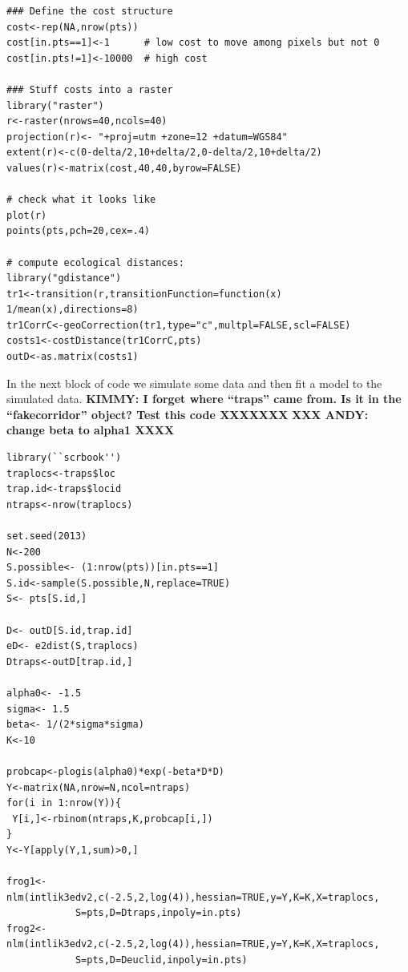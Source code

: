 {\small
\begin{verbatim}
### Define the cost structure
cost<-rep(NA,nrow(pts))
cost[in.pts==1]<-1      # low cost to move among pixels but not 0
cost[in.pts!=1]<-10000  # high cost

### Stuff costs into a raster
library("raster")
r<-raster(nrows=40,ncols=40)
projection(r)<- "+proj=utm +zone=12 +datum=WGS84"
extent(r)<-c(0-delta/2,10+delta/2,0-delta/2,10+delta/2)
values(r)<-matrix(cost,40,40,byrow=FALSE)

# check what it looks like
plot(r)  
points(pts,pch=20,cex=.4)

# compute ecological distances:
library("gdistance")
tr1<-transition(r,transitionFunction=function(x) 1/mean(x),directions=8)
tr1CorrC<-geoCorrection(tr1,type="c",multpl=FALSE,scl=FALSE)
costs1<-costDistance(tr1CorrC,pts)
outD<-as.matrix(costs1)
\end{verbatim}
}

In the next block of code we simulate some data and then fit a model
to the simulated data. {\bf KIMMY: I forget where ``traps'' came
  from. Is it in the ``fakecorridor'' object? Test this code XXXXXXX}
{\bf XXX ANDY: change beta to alpha1 XXXX}
{\small
\begin{verbatim}
library(``scrbook'')
traplocs<-traps$loc
trap.id<-traps$locid
ntraps<-nrow(traplocs)

set.seed(2013)
N<-200
S.possible<- (1:nrow(pts))[in.pts==1]
S.id<-sample(S.possible,N,replace=TRUE)
S<- pts[S.id,]

D<- outD[S.id,trap.id]
eD<- e2dist(S,traplocs)
Dtraps<-outD[trap.id,]

alpha0<- -1.5
sigma<- 1.5
beta<- 1/(2*sigma*sigma)
K<-10

probcap<-plogis(alpha0)*exp(-beta*D*D)
Y<-matrix(NA,nrow=N,ncol=ntraps)
for(i in 1:nrow(Y)){
 Y[i,]<-rbinom(ntraps,K,probcap[i,])
}
Y<-Y[apply(Y,1,sum)>0,]

frog1<-nlm(intlik3edv2,c(-2.5,2,log(4)),hessian=TRUE,y=Y,K=K,X=traplocs,
            S=pts,D=Dtraps,inpoly=in.pts)
frog2<-nlm(intlik3edv2,c(-2.5,2,log(4)),hessian=TRUE,y=Y,K=K,X=traplocs,
            S=pts,D=Deuclid,inpoly=in.pts)
\end{verbatim}
}

